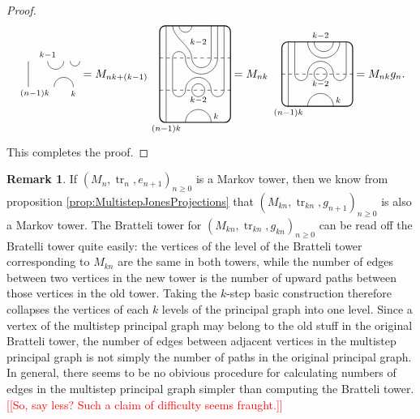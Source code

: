\documentclass[11pt]{article}
\theoremstyle{plain}
\theoremstyle{definition}
\newtheorem{remark}[thm]{Remark}
\DeclareMathOperator{\tr}{tr}
\newcommand{\nn}[1]{\textcolor{red}{[[#1]]}}
\begin{document}
\begin{proof}
$$\begin{tikzpicture}[baseline = .3cm]
	\draw (.2,0) -- (.2,.8);
	\draw (.8,.8) arc (-180:0:.25cm);
	\draw (1.5,.8) arc (-180:0:.15cm);
	\draw (1,0) arc (180:0:.3cm);
	\node at (.8,1) {\scriptsize{$k{-}1$}};
	\node at (1.6,-.2) {\scriptsize{$k$}};
	\node at (.4,-.2) {\scriptsize{$(n{-}1)k$}};
\end{tikzpicture}
=
M_{nk+(k-1)}
\begin{tikzpicture}[baseline = 1.4cm]
	\draw[thick, rounded corners = 5pt] (0,0) rectangle (2.2,3);
	\draw (.2,0) -- (.2,3);
	\draw (.6,3) arc (-180:0:.2cm);
	\draw (.4,3) .. controls ++(270:.35cm) and ++(90:.35cm) .. (1,2) arc (-180:0:.3cm) -- (1.6,3);
	\draw (1.8,3) -- (1.8,2) arc (0:-180:.5cm) arc (0:180:.2cm) -- (.4,1) arc (-180:0:.2cm) arc (180:0:.4cm) arc (-180:0:.2cm) -- (2,3);
	\draw (1.2,1) circle (.2cm);
	\draw (.8,0) arc (180:0:.4cm);
	\draw[dashed] (0,1) -- (2.2,1);
	\draw[dashed] (0,2) -- (2.2,2);
	\node at (1.2,.7) {\scriptsize{$k{-}2$}};
	\node at (1.2,2.5) {\scriptsize{$k{-}2$}};
	\node at (1.75,.2) {\scriptsize{$k$}};
	\node at (.2,-.2) {\scriptsize{$(n{-}1)k$}};
\end{tikzpicture}
=
M_{nk}\,
\begin{tikzpicture}[baseline = .9cm]
	\draw[thick, rounded corners = 5pt] (0,0) rectangle (2.2,2);
	\draw (.2,0) -- (.2,2);
	\draw (1,2) arc (-180:0:.3cm);
	\draw (1.8,2) arc (0:-180:.5cm); 
	\draw (.4,2) -- (.4,1) arc (-180:0:.2cm) arc (180:0:.4cm) arc (-180:0:.2cm) -- (2,2);
	\draw (1.2,1) circle (.2cm);
	\draw (.8,0) arc (180:0:.4cm);
	\draw[dashed] (0,1) -- (2.2,1);
	\node at (1.2,.7) {\scriptsize{$k{-}2$}};
	\node at (1.2,2.2) {\scriptsize{$k{-}2$}};
	\node at (1.75,.2) {\scriptsize{$k$}};
	\node at (.2,-.2) {\scriptsize{$(n{-}1)k$}};
\end{tikzpicture}
=
M_{nk} g_n.
$$
This completes the proof.
\end{proof}



\begin{remark}
If $\left( M_n, \tr_n, e_{n+1} \right )_{n \geq 0}$ is a Markov tower, then we know from proposition \ref{prop:MultistepJonesProjections} that 
$\left( M_{kn}, \tr_{kn}, g_{n+1} \right )_{n\geq 0}$ is also a Markov tower. 
	The Bratteli tower for $\left( M_{kn}, \tr_{kn}, g_{kn} \right )_{n\geq 0}$ can be read off the Bratelli tower quite easily: the vertices of the level of the Bratteli tower corresponding to $M_{kn}$ are the same in both towers, while the number of edges between two vertices in the new tower is the number of upward paths between those vertices in the old tower. Taking the $k$-step basic construction therefore collapses the vertices of each $k$ levels of the principal graph into one level. 
	Since a vertex of the multistep principal graph may belong to the old stuff in the original Bratteli tower, the number of edges between adjacent vertices in the multistep principal graph is not simply the number of paths in the original principal graph. In general, there seems to be no obivious procedure for calculating numbers of edges in the multistep principal graph simpler than computing the Bratteli tower. 
	\nn{So, say less? Such a claim of difficulty seems fraught.}
\end{remark}
\end{document}
